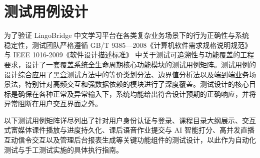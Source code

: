\chapter{测试用例设计}

为了验证 LingoBridge 中文学习平台在各类复杂业务场景下的行为正确性与系统稳定性，测试团队严格遵循 GB/T 9385—2008《计算机软件需求规格说明规范》\cite{gb9385} 与 IEEE 1016-2009《软件设计描述标准》\cite{ieee1016} 中关于测试可追溯性与功能覆盖的工程要求，设计了一套覆盖系统全生命周期核心功能模块的测试用例矩阵。测试用例的设计综合应用了黑盒测试方法中的等价类划分法、边界值分析法以及端到端业务场景法，特别针对高频交互和强数据依赖的模块进行了深度覆盖。测试设计的核心目标是确保在各种正常及异常输入下，系统均能给出符合设计预期的正确响应，并将异常阻断在用户交互界面之外。

以下测试用例矩阵详尽列出了针对用户身份认证与登录、课程目录大纲展示、交互式富媒体课件播放与进度持久化、课后语音作业提交与 AI 智能打分、高并发直播互动信令交互以及管理后台报表生成等关键功能组件的测试设计，以此作为自动化测试与手工测试实施的具体执行指南。

